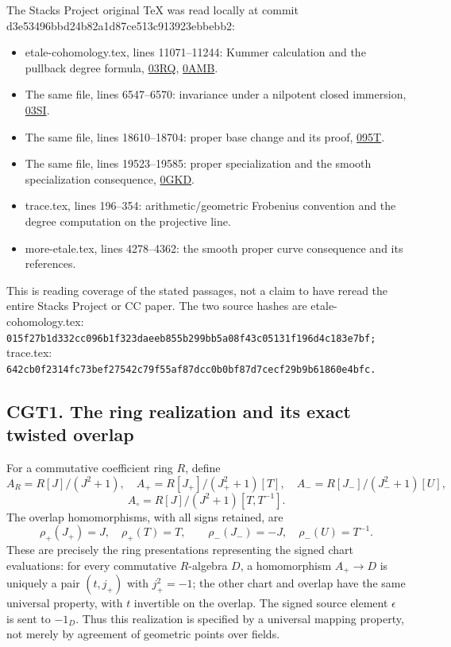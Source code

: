The Stacks Project original TeX was read locally at commit
d3e53496bbd24b82a1d87ce513c913923ebbebb2:

\begin{itemize}
\tightlist
\item
  etale-cohomology.tex, lines 11071--11244: Kummer calculation and the
  pullback degree formula,
  \href{https://stacks.math.columbia.edu/tag/03RQ}{03RQ},
  \href{https://stacks.math.columbia.edu/tag/0AMB}{0AMB}.
\item
  The same file, lines 6547--6570: invariance under a nilpotent closed
  immersion, \href{https://stacks.math.columbia.edu/tag/03SI}{03SI}.
\item
  The same file, lines 18610--18704: proper base change and its proof,
  \href{https://stacks.math.columbia.edu/tag/095T}{095T}.
\item
  The same file, lines 19523--19585: proper specialization and the
  smooth specialization consequence,
  \href{https://stacks.math.columbia.edu/tag/0GKD}{0GKD}.
\item
  trace.tex, lines 196--354: arithmetic/geometric Frobenius convention
  and the degree computation on the projective line.
\item
  more-etale.tex, lines 4278--4362: the smooth proper curve consequence
  and its references.
\end{itemize}

This is reading coverage of the stated passages, not a claim to have
reread the entire Stacks Project or CC paper. The two source hashes are
etale-cohomology.tex:
\nolinkurl{015f27b1d332cc096b1f323daeeb855b299bb5a08f43c05131f196d4c183e7bf;}
trace.tex:
\nolinkurl{642cb0f2314fc73bef27542c79f55af87dcc0b0bf87d7cecf29b9b61860e4bfc.}

\subsection{CGT1. The ring realization and its exact twisted
overlap}\label{cgt1.-the-ring-realization-and-its-exact-twisted-overlap}

For a commutative coefficient ring \(R\), define \[
A_R=R[J]/(J^2+1),\quad
A_+=R[J_+]/(J_+^2+1)[T],\quad
A_-=R[J_-]/(J_-^2+1)[U],
\] \[
A_\circ=R[J]/(J^2+1)[T,T^{-1}].
\tag{CGT1.1}
\] The overlap homomorphisms, with all signs retained, are \[
\rho_+(J_+)=J,\quad \rho_+(T)=T,\qquad
\rho_-(J_-)=-J,\quad \rho_-(U)=T^{-1}.
\tag{CGT1.2}
\] These are precisely the ring presentations representing the signed
chart evaluations: for every commutative \(R\)-algebra \(D\), a
homomorphism \(A_+\to D\) is uniquely a pair \((t,j_+)\) with
\(j_+^2=-1\); the other chart and overlap have the same universal
property, with \(t\) invertible on the overlap. The signed source
element \(\epsilon\) is sent to \(-1_D\). Thus this realization is
specified by a universal mapping property, not merely by agreement of
geometric points over fields.

